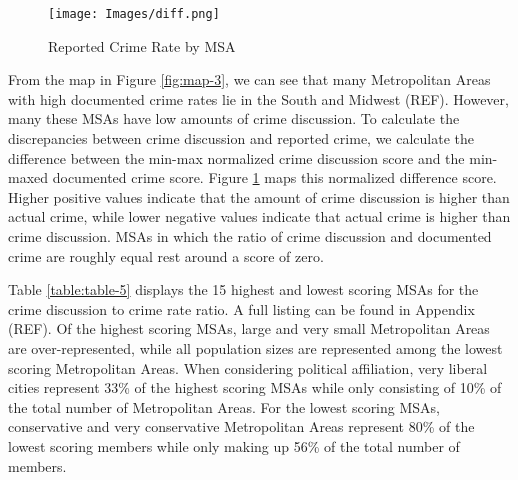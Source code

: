 \documentclass[12pt,oneside, letterpaper]{book}
\begin{document}
\begin{figure}[ht]
    \centering
    \texttt{[image: Images/diff.png]}
    \caption{Reported Crime Rate by MSA}
    \label{fig:map-4}
\end{figure}

\par From the map in Figure \ref{fig:map-3}, we can see that many Metropolitan Areas with high documented crime rates lie in the South and Midwest (REF). However, many these MSAs have low amounts of crime discussion. To calculate the discrepancies between crime discussion and reported crime, we calculate the difference between the min-max normalized crime discussion score and the min-maxed documented crime score. Figure \ref{fig:map-4} maps this normalized difference score. Higher positive values indicate that the amount of crime discussion is higher than actual crime, while lower negative values indicate that actual crime is higher than crime discussion. MSAs in which the ratio of crime discussion and documented crime are roughly equal rest around a score of zero.

\par Table \ref{table:table-5} displays the 15 highest and lowest scoring MSAs for the crime discussion to crime rate ratio. A full listing can be found in Appendix (REF). Of the highest scoring MSAs, large and very small Metropolitan Areas are over-represented, while all population sizes are represented among the lowest scoring Metropolitan Areas. When considering political affiliation, very liberal cities represent 33\% of the highest scoring MSAs while only consisting of 10\% of the total number of Metropolitan Areas. For the lowest scoring MSAs, conservative and very conservative Metropolitan Areas represent 80\% of the lowest scoring members while only making up 56\% of the total number of members.
\end{document}
